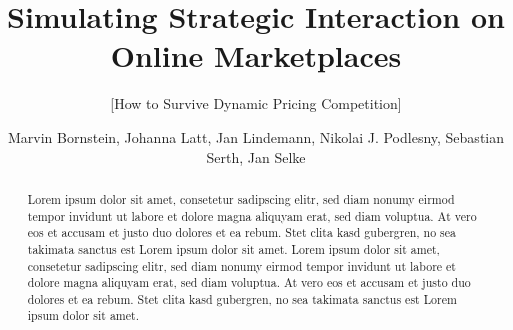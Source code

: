\documentclass{sig-alternate-05-2015}
\begin{document}



%


\title{Simulating Strategic Interaction on Online Marketplaces}
\subtitle{[How to Survive Dynamic Pricing Competition]}



%
\author{Marvin Bornstein, Johanna Latt, Jan Lindemann, Nikolai J. Podlesny, Sebastian Serth, Jan Selke}
    

\maketitle

%
%
%
%

\begin{abstract}
Lorem ipsum dolor sit amet, consetetur sadipscing elitr, sed diam nonumy eirmod tempor invidunt ut labore et dolore magna aliquyam erat, sed diam voluptua. At vero eos et accusam et justo duo dolores et ea rebum. Stet clita kasd gubergren, no sea takimata sanctus est Lorem ipsum dolor sit amet. Lorem ipsum dolor sit amet, consetetur sadipscing elitr, sed diam nonumy eirmod tempor invidunt ut labore et dolore magna aliquyam erat, sed diam voluptua. At vero eos et accusam et justo duo dolores et ea rebum. Stet clita kasd gubergren, no sea takimata sanctus est Lorem ipsum dolor sit amet.\\
\end{abstract}









\end{document}
